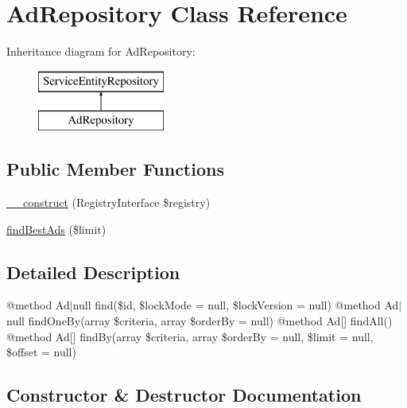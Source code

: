 \hypertarget{class_app_1_1_repository_1_1_ad_repository}{}\section{Ad\+Repository Class Reference}
\label{class_app_1_1_repository_1_1_ad_repository}
Inheritance diagram for Ad\+Repository\+:\begin{figure}[H]
\begin{center}
\leavevmode
\includegraphics[height=2.000000cm]{class_app_1_1_repository_1_1_ad_repository}
\end{center}
\end{figure}
\subsection*{Public Member Functions}
\begin{DoxyCompactItemize}
\item 
\mbox{\hyperlink{class_app_1_1_repository_1_1_ad_repository_aadca7edd263e228921a1860bb6b9c252}{\+\_\+\+\_\+construct}} (Registry\+Interface \$registry)
\item 
\mbox{\hyperlink{class_app_1_1_repository_1_1_ad_repository_ad584897206651b14c3ccfc97ad085f25}{find\+Best\+Ads}} (\$limit)
\end{DoxyCompactItemize}


\subsection{Detailed Description}
@method Ad$\vert$null find(\$id, \$lock\+Mode = null, \$lock\+Version = null) @method Ad$\vert$null find\+One\+By(array \$criteria, array \$order\+By = null) @method Ad\mbox{[}\mbox{]} find\+All() @method Ad\mbox{[}\mbox{]} find\+By(array \$criteria, array \$order\+By = null, \$limit = null, \$offset = null) 

\subsection{Constructor \& Destructor Documentation}
\mbox{\label{class_app_1_1_repository_1_1_ad_repository_aadca7edd263e228921a1860bb6b9c252}} 
